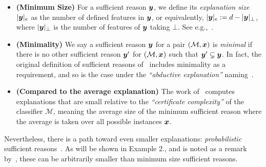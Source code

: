 \documentclass[11pt, letterpaper]{article}
\newcommand{\M}{\mathcal{M}}
\begin{document}
\begin{itemize}
    \item \textbf{(Minimum Size)} For a sufficient reason ${\bm{y}}$, we define its \emph{explanation size} $|{\bm{y}}|_e$ as the number of defined features in ${\bm{y}}$, or equivalently, $|{\bm{y}}|_e := d - |{\bm{y}}|_\bot$, where $|{\bm{y}}|_\bot$ is the number of features of ${\bm{y}}$ taking $\bot$. See e.g.,~\cite{NEURIPS2020_b1adda14}.
    \item \textbf{(Minimality)} We say a sufficient reason ${\bm{y}}$ for a pair $(\M, \vx)$ is \emph{minimal} if there is no other sufficient reason ${\bm{y}}'$ for $(\M, \vx)$ such that ${\bm{y}}' \subsetneq {\bm{y}}$. In fact, the original definition of sufficient reasons of~\cite{Darwiche_Hirth_2020} includes minimality as a requirement, and so is the case under the \emph{``abductive explanation''} naming~\cite{Ignatiev_Narodytska_Asher_Marques-Silva_2021}.
    \item \textbf{(Compared to the average explanation)} The work of~\cite{blanc2021provably} computes explanations that are small relative to the \emph{``certificate complexity''} of the classifier $\M$, meaning the average size of the minimum sufficient reason where the average is taken over all possible instances ${\bm{x}}$.
\end{itemize}

Nevertheless, there is a path toward even smaller explanations: \emph{probabilistic} sufficient reasons~\cite{Waldchen_MacDonald_Hauch_Kutyniok_2021, Izza_Huang_Ignatiev_Narodytska_Cooper_Marques-Silva_2023}. 
As will be shown in Example 2., and is noted as a remark by~\cite{blanc2021provably}, these can be arbitrarily smaller than minimum size sufficient reasons.









\end{document}
